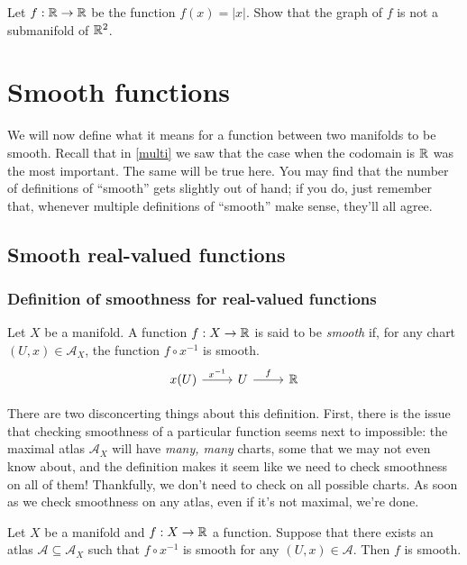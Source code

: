 \begin{exercise}
	Let $f : \mathbb{R} \to \mathbb{R}$ be the function $f(x) = |x|$. Show that the graph of $f$ is not a submanifold of $\mathbb{R}^2$. 
\end{exercise}

\section{Smooth functions}

We will now define what it means for a function between two manifolds to be smooth. Recall that in \cref{multi} we saw that the case when the codomain is $\mathbb{R}$ was the most important. The same will be true here. You may find that the number of definitions of ``smooth'' gets slightly out of hand; if you do, just remember that, whenever multiple definitions of ``smooth'' make sense, they'll all agree. 

\subsection{Smooth real-valued functions}

\subsubsection*{Definition of smoothness for real-valued functions}

\begin{definition} \label{smooth-real-valued} 
	Let $X$ be a manifold. A function $f : X \to \mathbb{R}$ is said to be \emph{smooth} if, for any chart $(U, x) \in \mathscr{A}_X$, the function $f \circ x^{-1}$ is smooth.
	\[ \begin{tikzcd} x(U) \ar{r}{x^{-1}} & U \ar{r}{f} & \R \end{tikzcd} \]
\end{definition}

There are two disconcerting things about this definition. First, there is the issue that checking smoothness of a particular function seems next to impossible: the maximal atlas $\mathscr{A}_X$ will have \emph{many, many} charts, some that we may not even know about, and the definition makes it seem like we need to check smoothness on all of them! Thankfully, we don't need to check on all possible charts. As soon as we check smoothness on any atlas, even if it's not maximal, we're done. 

\begin{lemma} \label{smooth-real-valued-local}
	Let $X$ be a manifold and $f : X \to \mathbb{R}$ a function. Suppose that there exists an atlas $\mathscr{A} \subseteq \mathscr{A}_X$ such that $f \circ x^{-1}$ is smooth for any $(U, x) \in \mathscr{A}$. Then $f$ is smooth. 
\end{lemma}

